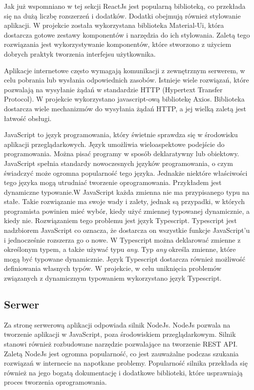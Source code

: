 \documentclass[a4paper,12pt]{book}
\begin{document}
Jak już wspomniano w tej sekcji ReactJs jest popularną biblioteką, co przekłada się na dużą liczbę rozszerzeń i dodatków. Dodatki obejmują również stylowanie aplikacji. W projekcie została wykorzystana biblioteka Material-Ui, która dostarcza gotowe zestawy komponentów i narzędzia do ich stylowania. Zaletą tego rozwiązania jest wykorzystywanie komponentów, które stworzono z użyciem dobrych praktyk tworzenia interfejsu użytkownika.

Aplikacje internetowe często wymagają komunikacji z zewnętrznym serwerem, w celu pobrania lub wysłania odpowiednich zasobów. Istnieje wiele rozwiązań, które pozwalają na wysyłanie żądań w standardzie HTTP (Hypertext Transfer Protocol). W projekcie wykorzystano javascript-ową bibliotekę Axios. Biblioteka dostarcza wiele mechanizmów do wysyłania żądań HTTP, a jej wielką zaletą jest łatwość obsługi.

JavaScript to język programowania, który świetnie sprawdza się w środowisku aplikacji przeglądarkowych. Język umożliwia wieloaspektowe podejście do programowania. Można pisać programy w sposób deklaratywny lub obiektowy. JavaScript spełnia standardy nowoczesnych języków programowania, o czym świadczyć może ogromna popularność tego języka. Jednakże niektóre właściwości tego języka mogą utrudniać tworzenie oprogramowania. Przykładem jest dynamiczne typowanie.W JavaScript każda zmienna nie ma przypisanego typu na stałe. Takie rozwiązanie ma swoje wady i zalety, jednak są przypadki, w których programista powinien mieć wybór, kiedy użyć zmiennej typowanej dynamicznie, a kiedy nie. Rozwiązaniem tego problemu jest język Typescript. Typescript jest nadzbiorem JavaScript co oznacza, że dostarcza on wszystkie funkcje JavaScript'u i jednocześnie rozszerza go o nowe. W Typescript można deklarować zmienne z określonym typem, a także używać typu \textit{any}. Typ \textit{any} określa zmienne, które mogą być typowane dynamicznie. Język Typescript dostarcza również możliwość definiowania własnych typów. W projekcie, w celu uniknięcia problemów związanych z dynamicznym typowaniem wykorzystano język Typescript.

\subsection{Serwer}
Za stronę serwerową aplikacji odpowiada silnik NodeJs. NodeJs pozwala na tworzenie aplikacji w JavaScript, poza środowiskiem przeglądarkowym. Silnik stanowi również rozbudowane narzędzie pozwalające na tworzenie REST API. Zaletą NodeJs jest ogromna popularność, co jest zauważalne podczas szukania rozwiązań w internecie na napotkane problemy. Popularność silnika przekłada się również na jego bogatą dokumentację i dodatkowe biblioteki, które usprawniają proces tworzenia oprogramowania.
\end{document}
